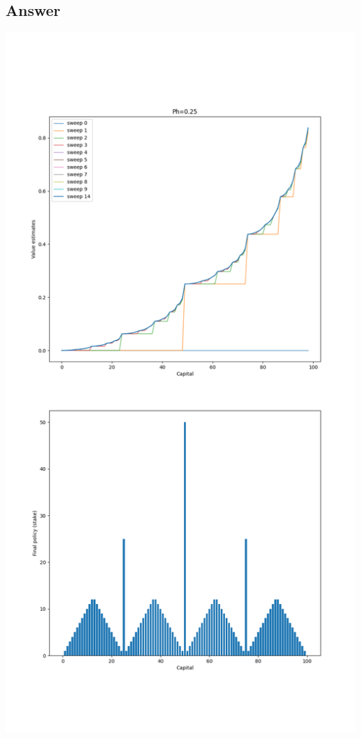 \documentclass[11pt]{article}
\begin{document}
    \subsection*{Answer}

    \includegraphics[scale=0.4]{figure_4_3_e_4_9_p25}
\end{document}
